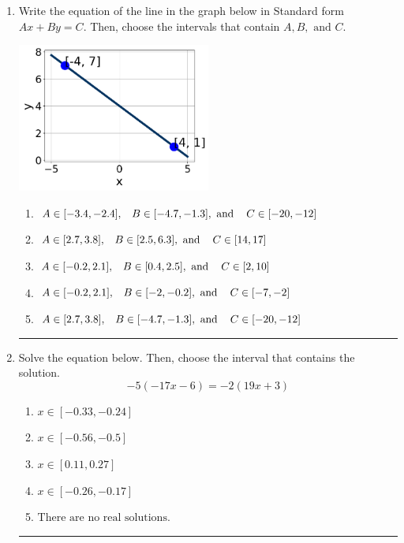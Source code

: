 \documentclass[14pt]{extbook}
\newcommand{\litem}[1]{\item#1\hspace*{-1cm}\rule{\textwidth}{0.4pt}}
\begin{document}
\begin{enumerate}
{\begin{enumerate}[label=\Alph*.]
\end{enumerate} }
\litem{
Write the equation of the line in the graph below in Standard form $Ax+By=C$. Then, choose the intervals that contain $A, B, \text{ and } C$.
\begin{center}
    \includegraphics[width=0.5\textwidth]{../Figures/linearGraphToStandardC.png}
\end{center}
\begin{enumerate}[label=\Alph*.]
\item \( A \in [-3.4, -2.4], \hspace{3mm} B \in [-4.7, -1.3], \text{ and } \hspace{3mm} C \in [-20, -12] \)
\item \( A \in [2.7, 3.8], \hspace{3mm} B \in [2.5, 6.3], \text{ and } \hspace{3mm} C \in [14, 17] \)
\item \( A \in [-0.2, 2.1], \hspace{3mm} B \in [0.4, 2.5], \text{ and } \hspace{3mm} C \in [2, 10] \)
\item \( A \in [-0.2, 2.1], \hspace{3mm} B \in [-2, -0.2], \text{ and } \hspace{3mm} C \in [-7, -2] \)
\item \( A \in [2.7, 3.8], \hspace{3mm} B \in [-4.7, -1.3], \text{ and } \hspace{3mm} C \in [-20, -12] \)

\end{enumerate} }
\litem{
Solve the equation below. Then, choose the interval that contains the solution.\[ -5(-17x -6) = -2(19x + 3) \]\begin{enumerate}[label=\Alph*.]
\item \( x \in [-0.33, -0.24] \)
\item \( x \in [-0.56, -0.5] \)
\item \( x \in [0.11, 0.27] \)
\item \( x \in [-0.26, -0.17] \)
\item \( \text{There are no real solutions.} \)


\end{enumerate}}
\end{enumerate}
\end{document}

